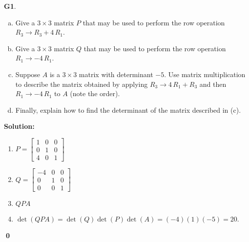 \documentclass{article}
\newenvironment{problem}[1]
{
  \begin{flushleft}
  \textbf{#1}.
  \ignorespaces
}
{
  \end{flushleft}
}
\newenvironment{solution}
{
  \ignorespaces
  \textbf{Solution:}
}
{
  \ignorespacesafterend
  \begin{flushright}
  {\bfseries \qed}
  \end{flushright}
}
\begin{document}
\begin{problem}{G1}
\begin{enumerate}[(a)]
\item Give a \(3\times 3\) matrix \(P\) that may be used to perform the row
      operation \({R_3} \to R_3+4 \, {R_1} \).
\item Give a \(3\times 3\) matrix \(Q\) that may be used to perform the row
      operation \({R_1} \to -4 \, {R_1}\).
\item Suppose \(A\) is a \(3\times 3\) matrix with determinant \(-5\).
      Use matrix multiplication to describe the matrix obtained by applying 
        \({R_3} \to 4 \, {R_1} + {R_3}\) and then \({R_1} \to -4 \, {R_1}\)
      to \(A\) (note the order).
\item Finally, explain how to find the determinant of the matrix described in (c).

\end{enumerate}
\end{problem}
\begin{solution}
\begin{enumerate}
\item 
\(P=\begin{bmatrix} 1 & 0 & 0 \\ 0 & 1 & 0 \\ 4 & 0 & 1 \end{bmatrix}\)
\item
\(Q=\begin{bmatrix} -4 & 0 & 0 \\ 0 & 1 & 0 \\ 0 & 0 & 1 \end{bmatrix}\)
\item \( QPA\)
\item \(\det (QPA) = \det(Q) \det(P) \det(A) = (-4) (1) (-5) = 20\).
\end{enumerate}
\end{solution}
\end{document}
